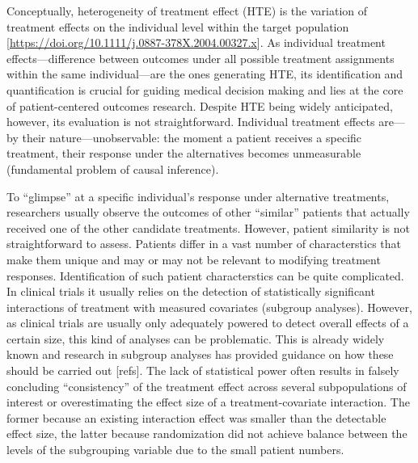 \documentclass[
]{book}
\begin{document}
Conceptually, heterogeneity of treatment effect (HTE) is the variation of
treatment effects on the individual level within the target population
{[}\url{https://doi.org/10.1111/j.0887-378X.2004.00327.x}{]}. As individual treatment
effects---difference between outcomes under all possible treatment assignments
within the same individual---are the ones generating HTE, its identification
and quantification is crucial for guiding medical decision making and lies at
the core of patient-centered outcomes research. Despite HTE being widely
anticipated, however, its evaluation is not straightforward. Individual
treatment effects are---by their nature---unobservable: the moment a
patient receives a specific treatment, their response under the alternatives
becomes unmeasurable (fundamental problem of causal inference).

To ``glimpse'' at a specific individual's response under alternative treatments,
researchers usually observe the outcomes of other ``similar'' patients that
actually received one of the other candidate treatments. However, patient
similarity is not straightforward to assess. Patients differ in a vast number of
characterstics that make them unique and may or may not be relevant to modifying
treatment responses. Identification of such patient characterstics can be quite
complicated. In clinical trials it usually relies on the detection of
statistically significant interactions of treatment with measured covariates
(subgroup analyses). However, as clinical trials are usually only adequately
powered to detect overall effects of a certain size, this kind of analyses can
be problematic. This is already widely known and research in subgroup analyses
has provided guidance on how these should be carried out {[}refs{]}. The lack of
statistical power often results in falsely concluding ``consistency'' of the
treatment effect across several subpopulations of interest or overestimating the
effect size of a treatment-covariate interaction. The former because an existing
interaction effect was smaller than the detectable effect size, the latter
because randomization did not achieve balance between the levels of the
subgrouping variable due to the small patient numbers.
\end{document}
